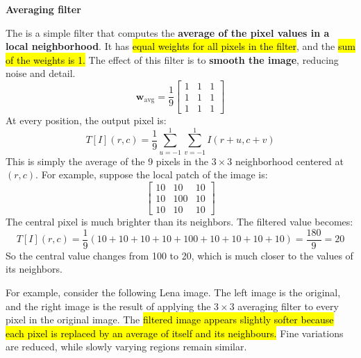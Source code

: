 \highspace
\begin{flushleft}
    \textcolor{Green3}{ \textbf{Averaging filter}}
\end{flushleft}
The  is a simple filter that computes the \textbf{average of the pixel values in a local neighborhood}. It has \hl{equal weights for all pixels in the filter}, and the \hl{sum of the weights is 1.} The effect of this filter is to \textbf{smooth the image}, reducing noise and detail.
\begin{equation}
    \mathbf{w}_{\text{avg}} = \frac{1}{9} \begin{bmatrix}
        1 & 1 & 1 \\
        1 & 1 & 1 \\
        1 & 1 & 1
    \end{bmatrix}
\end{equation}
At every position, the output pixel is:
\begin{equation*}
    T[I](r,c) = \frac{1}{9} \sum_{u=-1}^{1} \sum_{v=-1}^{1} I(r+u, c+v)
\end{equation*}
This is simply the average of the 9 pixels in the $3 \times 3$ neighborhood centered at $(r,c)$. For example, suppose the local patch of the image is:
\begin{equation*}
    \begin{bmatrix}
        10 & 10 & 10 \\
        10 & 100 & 10 \\
        10 & 10 & 10
    \end{bmatrix}
\end{equation*}
The central pixel is much brighter than its neighbors. The filtered value becomes:
\begin{equation*}
    T[I](r,c) = \frac{1}{9} (10 + 10 + 10 + 10 + 100 + 10 + 10 + 10 + 10) = \frac{180}{9} = 20
\end{equation*}
So the central value changes from 100 to 20, which is much closer to the values of its neighbors.

\highspace
For example, consider the following Lena image. The left image is the original, and the right image is the result of applying the $3 \times 3$ averaging filter to every pixel in the original image. The \hl{filtered image appears slightly softer because each pixel is replaced by an average of itself and its neighbours.} Fine variations are reduced, while slowly varying regions remain similar.


